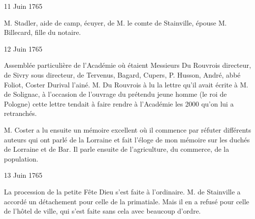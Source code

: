                      \begin{diary}{11 Juin 1765}{}
                        
                        
                           M. Stadler, aide de camp, écuyer,
                           de M. le
                              comte de Stainville, épouse M. Billecard,
                           fille du notaire. \bigskip
        
        
                     \end{diary}

                     \begin{diary}{12 Juin 1765}{}
                        
                         Assemblée particulière de l'Académie où
                           étaient Messieurs
                           Du Rouvrois directeur, de Sivry
                           sous directeur, de Tervenus, Bagard, Cupers,
                           P. Husson, André, abbé Foliot,
                              Coster
                           Durival l'ainé. M. Du Rouvrois à lu la lettre
                           qu'il avait écrite à M. de
                              Solignac, à l'occasion
                           de l'ouvrage du prétendu jeune homme (le roi de Pologne)
                           cette lettre tendait à faire rendre à l'Académie
                           les 2000 qu'on lui a retranchés. \bigskip
        
        
                        
                           M. Coster a lu ensuite un mémoire excellent
                           où il commence par réfuter différents auteurs
                           qui ont parlé de la Lorraine et fait l'éloge
                           de mon mémoire sur les duchés de Lorraine et de
                                 Bar. Il parle ensuite de l'agriculture, du
                           commerce, de la population. \bigskip
        
        
                     \end{diary}
                     
                     

                     \begin{diary}{13 Juin 1765}{}
                        
                         La procession de la petite Fête
                           Dieu s'est faite
                           à l'ordinaire. M. de
                              Stainville a accordé un
                           détachement pour celle de la
                              primatiale. Mais
                           il en a refusé pour celle de l'hôtel de ville,
                           qui s'est faite sans cela avec beaucoup d'ordre. \bigskip
        
        
                     \end{diary}

